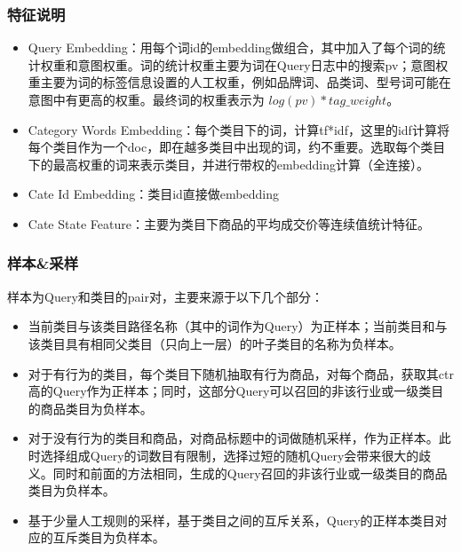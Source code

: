 \subsubsection{特征说明}
\begin{itemize}
\item Query Embedding：用每个词id的embedding做组合，其中加入了每个词的统计权重和意图权重。词的统计权重主要为词在Query日志中的搜索pv；意图权重主要为词的标签信息设置的人工权重，例如品牌词、品类词、型号词可能在意图中有更高的权重。最终词的权重表示为 $log( pv ) * tag\_weight $。
\item Category Words Embedding：每个类目下的词，计算tf*idf，这里的idf计算将每个类目作为一个doc，即在越多类目中出现的词，约不重要。选取每个类目下的最高权重的词来表示类目，并进行带权的embedding计算（全连接）。
\item Cate Id Embedding：类目id直接做embedding
\item Cate State Feature：主要为类目下商品的平均成交价等连续值统计特征。
\end{itemize}
\subsubsection{样本\&采样}
样本为Query和类目的pair对，主要来源于以下几个部分：
\begin{itemize}
\item 当前类目与该类目路径名称（其中的词作为Query）为正样本；当前类目和与该类目具有相同父类目（只向上一层）的叶子类目的名称为负样本。
\item 对于有行为的类目，每个类目下随机抽取有行为商品，对每个商品，获取其ctr高的Query作为正样本；同时，这部分Query可以召回的非该行业或一级类目的商品类目为负样本。
\item 对于没有行为的类目和商品，对商品标题中的词做随机采样，作为正样本。此时选择组成Query的词数目有限制，选择过短的随机Query会带来很大的歧义。同时和前面的方法相同，生成的Query召回的非该行业或一级类目的商品类目为负样本。
\item 基于少量人工规则的采样，基于类目之间的互斥关系，Query的正样本类目对应的互斥类目为负样本。
\end{itemize}
